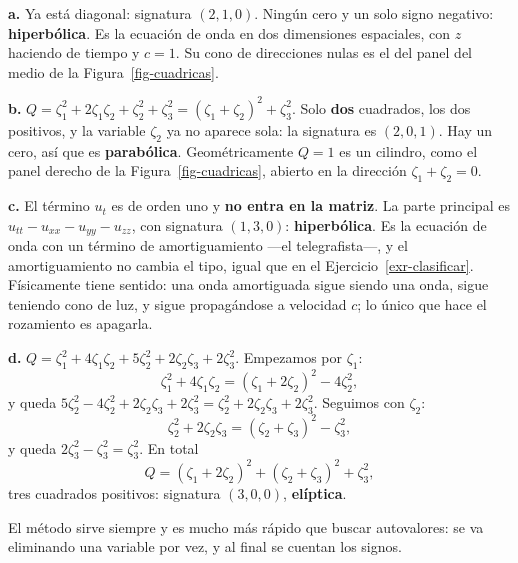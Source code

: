 \documentclass[
  spanish,
  a4paper,
]{scrbook}
\theoremstyle{definition}
\theoremstyle{plain}
\theoremstyle{definition}
\theoremstyle{plain}
\theoremstyle{definition}
\theoremstyle{remark}
\begin{document}
\begin{tcolorbox}[enhanced jigsaw, arc=.35mm, bottomrule=.15mm, bottomtitle=1mm, breakable, colback=white, colbacktitle=quarto-callout-tip-color!10!white, colframe=quarto-callout-tip-color-frame, coltitle=black, left=2mm, leftrule=.75mm, opacityback=0, opacitybacktitle=0.6, rightrule=.15mm, title=\textcolor{quarto-callout-tip-color}{\faLightbulb}\hspace{0.5em}{Solución}, titlerule=0mm, toprule=.15mm, toptitle=1mm]

\textbf{a.} Ya está diagonal: signatura \((2,1,0)\). Ningún cero y un
solo signo negativo: \textbf{hiperbólica}. Es la ecuación de onda en dos
dimensiones espaciales, con \(z\) haciendo de tiempo y \(c=1\). Su cono
de direcciones nulas es el del panel del medio de la
Figura~\ref{fig-cuadricas}.

\textbf{b.}
\(Q = \zeta_1^2 + 2\zeta_1\zeta_2 + \zeta_2^2 + \zeta_3^2 = (\zeta_1+\zeta_2)^2 + \zeta_3^2\).
Solo \textbf{dos} cuadrados, los dos positivos, y la variable
\(\zeta_2\) ya no aparece sola: la signatura es \((2,0,1)\). Hay un
cero, así que es \textbf{parabólica}. Geométricamente \(Q=1\) es un
cilindro, como el panel derecho de la Figura~\ref{fig-cuadricas},
abierto en la dirección \(\zeta_1+\zeta_2=0\).

\textbf{c.} El término \(u_t\) es de orden uno y \textbf{no entra en la
matriz}. La parte principal es \(u_{tt}-u_{xx}-u_{yy}-u_{zz}\), con
signatura \((1,3,0)\): \textbf{hiperbólica}. Es la ecuación de onda con
un término de amortiguamiento ---el telegrafista---, y el
amortiguamiento no cambia el tipo, igual que en el
Ejercicio~\ref{exr-clasificar}. Físicamente tiene sentido: una onda
amortiguada sigue siendo una onda, sigue teniendo cono de luz, y sigue
propagándose a velocidad \(c\); lo único que hace el rozamiento es
apagarla.

\textbf{d.}
\(Q = \zeta_1^2 + 4\zeta_1\zeta_2 + 5\zeta_2^2 + 2\zeta_2\zeta_3 + 2\zeta_3^2\).
Empezamos por \(\zeta_1\):
\[\zeta_1^2 + 4\zeta_1\zeta_2 = (\zeta_1+2\zeta_2)^2 - 4\zeta_2^2 ,\] y
queda
\(5\zeta_2^2 - 4\zeta_2^2 + 2\zeta_2\zeta_3 + 2\zeta_3^2 = \zeta_2^2 + 2\zeta_2\zeta_3 + 2\zeta_3^2\).
Seguimos con \(\zeta_2\):
\[\zeta_2^2 + 2\zeta_2\zeta_3 = (\zeta_2+\zeta_3)^2 - \zeta_3^2 ,\] y
queda \(2\zeta_3^2 - \zeta_3^2 = \zeta_3^2\). En total
\[Q = (\zeta_1+2\zeta_2)^2 + (\zeta_2+\zeta_3)^2 + \zeta_3^2 ,\] tres
cuadrados positivos: signatura \((3,0,0)\), \textbf{elíptica}.

El método sirve siempre y es mucho más rápido que buscar autovalores: se
va eliminando una variable por vez, y al final se cuentan los signos.

\end{tcolorbox}
\end{document}
